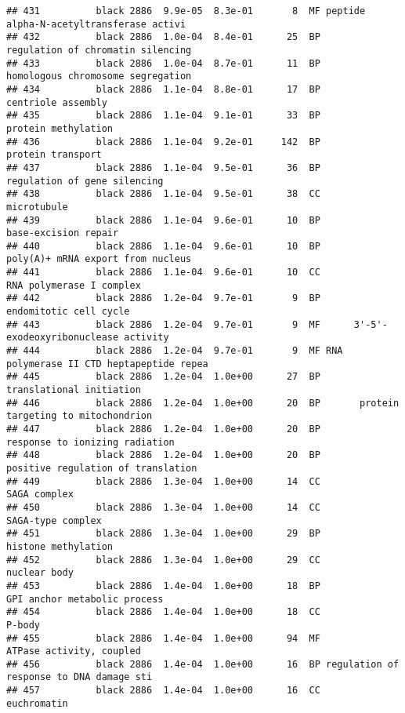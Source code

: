 \documentclass[]{article}
\begin{document}
\begin{verbatim}
## 431          black 2886  9.9e-05  8.3e-01       8  MF peptide alpha-N-acetyltransferase activi
## 432          black 2886  1.0e-04  8.4e-01      25  BP        regulation of chromatin silencing
## 433          black 2886  1.0e-04  8.7e-01      11  BP        homologous chromosome segregation
## 434          black 2886  1.1e-04  8.8e-01      17  BP                       centriole assembly
## 435          black 2886  1.1e-04  9.1e-01      33  BP                      protein methylation
## 436          black 2886  1.1e-04  9.2e-01     142  BP                        protein transport
## 437          black 2886  1.1e-04  9.5e-01      36  BP             regulation of gene silencing
## 438          black 2886  1.1e-04  9.5e-01      38  CC                              microtubule
## 439          black 2886  1.1e-04  9.6e-01      10  BP                     base-excision repair
## 440          black 2886  1.1e-04  9.6e-01      10  BP        poly(A)+ mRNA export from nucleus
## 441          black 2886  1.1e-04  9.6e-01      10  CC                 RNA polymerase I complex
## 442          black 2886  1.2e-04  9.7e-01       9  BP                   endomitotic cell cycle
## 443          black 2886  1.2e-04  9.7e-01       9  MF      3'-5'-exodeoxyribonuclease activity
## 444          black 2886  1.2e-04  9.7e-01       9  MF RNA polymerase II CTD heptapeptide repea
## 445          black 2886  1.2e-04  1.0e+00      27  BP                 translational initiation
## 446          black 2886  1.2e-04  1.0e+00      20  BP       protein targeting to mitochondrion
## 447          black 2886  1.2e-04  1.0e+00      20  BP           response to ionizing radiation
## 448          black 2886  1.2e-04  1.0e+00      20  BP       positive regulation of translation
## 449          black 2886  1.3e-04  1.0e+00      14  CC                             SAGA complex
## 450          black 2886  1.3e-04  1.0e+00      14  CC                        SAGA-type complex
## 451          black 2886  1.3e-04  1.0e+00      29  BP                      histone methylation
## 452          black 2886  1.3e-04  1.0e+00      29  CC                             nuclear body
## 453          black 2886  1.4e-04  1.0e+00      18  BP             GPI anchor metabolic process
## 454          black 2886  1.4e-04  1.0e+00      18  CC                                   P-body
## 455          black 2886  1.4e-04  1.0e+00      94  MF                 ATPase activity, coupled
## 456          black 2886  1.4e-04  1.0e+00      16  BP regulation of response to DNA damage sti
## 457          black 2886  1.4e-04  1.0e+00      16  CC                              euchromatin

\end{verbatim}
\end{document}

